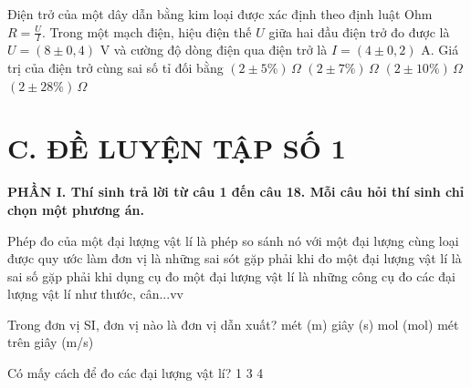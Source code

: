 \begin{vd}
Điện trở của một dây dẫn bằng kim loại được xác định theo định luật Ohm $R = \frac{U}{I}$. Trong một mạch điện, hiệu điện thế $U$ giữa hai đầu điện trở đo được là $U = (8 \pm 0{,}4)\text{ V}$ và cường độ dòng điện qua điện trở là $I = (4 \pm 0{,}2)\text{ A}$. Giá trị của điện trở cùng sai số tỉ đối bằng
\choice
{$(2 \pm 5\%)\,\Omega$}
{$(2 \pm 7\%)\,\Omega$}
{\True $(2 \pm 10\%)\,\Omega$}
{$(2 \pm 28\%)\,\Omega$}
\end{vd}
\vspace{0.3cm}

\section*{C. ĐỀ LUYỆN TẬP SỐ 1}

\noindent\textbf{\large PHẦN I. Thí sinh trả lời từ câu 1 đến câu 18. Mỗi câu hỏi thí sinh chỉ chọn một phương án.}\par\vspace{0.2cm}
\begin{ex} Phép đo của một đại lượng vật lí
\choice
{\True là phép so sánh nó với một đại lượng cùng loại được quy ước làm đơn vị}
{là những sai sót gặp phải khi đo một đại lượng vật lí}
{là sai số gặp phải khi dụng cụ đo một đại lượng vật lí}
{là những công cụ đo các đại lượng vật lí như thước, cân...vv}
\loigiai{}
\end{ex}

\begin{ex} Trong đơn vị SI, đơn vị nào là đơn vị dẫn xuất?
\choice
{mét (m)}
{giây (s)}
{mol (mol)}
{\True mét trên giây (m/s)}
\loigiai{}
\end{ex}

\begin{ex} Có mấy cách để đo các đại lượng vật lí?
\choice
{1}
{}
{3}
{4}
\loigiai{}
\end{ex}

